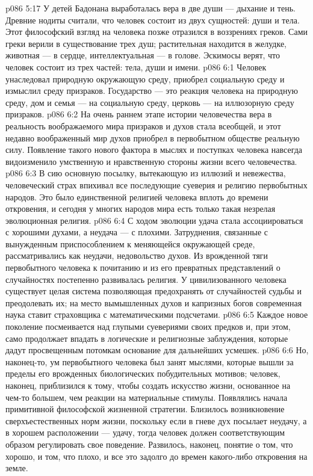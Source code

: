 \vs p086 5:17 У детей Бадонана выработалась вера в две души --- дыхание и тень. Древние нодиты считали, что человек состоит из двух сущностей: души и тела. Этот философский взгляд на человека позже отразился в воззрениях греков. Сами греки верили в существование трех душ; растительная находится в желудке, животная --- в сердце, интеллектуальная --- в голове. Эскимосы верят, что человек состоит из трех частей: тела, души и имени.
\vs p086 6:1 Человек унаследовал природную окружающую среду, приобрел социальную среду и измыслил среду призраков. Государство --- это реакция человека на природную среду, дом и семья --- на социальную среду, церковь --- на иллюзорную среду призраков.
\vs p086 6:2 На очень раннем этапе истории человечества вера в реальность воображаемого мира призраков и духов стала всеобщей, и этот недавно воображенный мир духов приобрел в первобытном обществе реальную силу. Появление такого нового фактора в мыслях и поступках человека навсегда видоизменило умственную и нравственную стороны жизни всего человечества.
\vs p086 6:3 В сию основную посылку, вытекающую из иллюзий и невежества, человеческий страх впихивал все последующие суеверия и религию первобытных народов. Это было единственной религией человека вплоть до времени откровения, и сегодня у многих народов мира есть только такая незрелая эволюционная религия.
\vs p086 6:4 С ходом эволюции удача стала ассоциироваться с хорошими духами, а неудача --- с плохими. Затруднения, связанные с вынужденным приспособлением к меняющейся окружающей среде, рассматривались как неудачи, недовольство духов. Из врожденной тяги первобытного человека к почитанию и из его превратных представлений о случайностях постепенно развивалась религия. У цивилизованного человека существует целая система позволяющая предохранять от случайностей судьбы и преодолевать их; на место вымышленных духов и капризных богов современная наука ставит страховщика с математическими подсчетами.
\vs p086 6:5 Каждое новое поколение посмеивается над глупыми суевериями своих предков и, при этом, само продолжает впадать в логические и религиозные заблуждения, которые дадут просвещенным потомкам основание для дальнейших усмешек.
\vs p086 6:6 \pc Но, наконец\hyp{}то, ум первобытного человека был занят мыслями, которые вышли за пределы его врожденных биологических побудительных мотивов; человек, наконец, приблизился к тому, чтобы создать искусство жизни, основанное на чем\hyp{}то большем, чем реакции на материальные стимулы. Появлялись начала примитивной философской жизненной стратегии. Близилось возникновение сверхъестественных норм жизни, поскольку если в гневе дух посылает неудачу, а в хорошем расположении --- удачу, тогда человек должен соответствующим образом регулировать свое поведение. Развилось, наконец, понятие о том, что хорошо, и том, что плохо, и все это задолго до времен какого\hyp{}либо откровения на земле.
